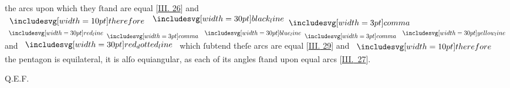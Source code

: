 \documentclass[12pt,preview]{standalone}
\begin{document}
\begin{minipage}[t]{0.64\textwidth}
    \hfill

    \hfill

    \raggedright the arcs upon which they ſtand are equal [\hyperref[book3pr26]{\textsc{III.} 26}] and $\btherefore \blackline \bcomma$\\
    $\redline \bcomma \blueline \bcomma \yellowline$ and $\dottedredline$ which ſubtend theſe arcs are equal [\hyperref[book3pr29]{\textsc{III.} 29}] and $\btherefore$ the pentagon is equilateral, it is alſo equiangular, as each of its angles ſtand upon equal arcs \mbox{[\hyperref[book3pr27]{\textsc{III.} 27}]}.

    \hfill

    \hfill Q.E.F.
\end{minipage}%
\end{document}
